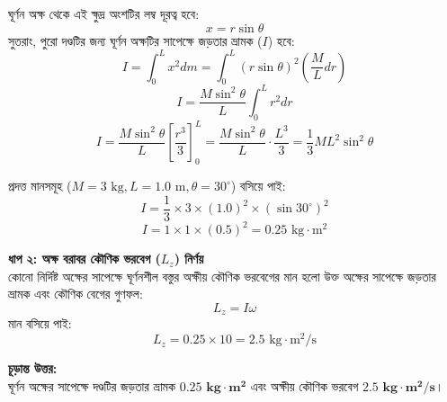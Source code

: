 \documentclass[12pt, a4paper]{article}
\begin{document}
\begin{tcolorbox}[solutionbox={সমাধান (Solution)}]
\begin{center}
\begin{tikzpicture}[>=Stealth, scale=1.4, text=black]
\end{tikzpicture}
\end{center}
\vspace{1em}

ঘূর্ণন অক্ষ থেকে এই ক্ষুদ্র অংশটির লম্ব দূরত্ব হবে: 
$$x = r \sin\theta$$
সুতরাং, পুরো দণ্ডটির জন্য ঘূর্ণন অক্ষটির সাপেক্ষে জড়তার ভ্রামক ($I$) হবে:
$$I = \int_0^L x^2 dm = \int_0^L (r \sin\theta)^2 \left( \frac{M}{L} dr \right)$$ 
$$I = \frac{M \sin^2\theta}{L} \int_0^L r^2 dr$$ 
$$I = \frac{M \sin^2\theta}{L} \left[ \frac{r^3}{3} \right]_0^L = \frac{M \sin^2\theta}{L} \cdot \frac{L^3}{3} = \frac{1}{3} M L^2 \sin^2\theta$$

প্রদত্ত মানসমূহ ($M = 3\text{ kg}, L = 1.0\text{ m}, \theta = 30^\circ$) বসিয়ে পাই:
$$I = \frac{1}{3} \times 3 \times (1.0)^2 \times (\sin 30^\circ)^2$$
$$I = 1 \times 1 \times (0.5)^2 = 0.25\text{ kg}\cdot\text{m}^2$$

\vspace{0.5em}
\noindent
\textbf{ধাপ ২: অক্ষ বরাবর কৌণিক ভরবেগ ($L_z$) নির্ণয়} \\
কোনো নির্দিষ্ট অক্ষের সাপেক্ষে ঘূর্ণনশীল বস্তুর অক্ষীয় কৌণিক ভরবেগের মান হলো উক্ত অক্ষের সাপেক্ষে জড়তার ভ্রামক এবং কৌণিক বেগের গুণফল:
$$L_z = I \omega$$
মান বসিয়ে পাই:
$$L_z = 0.25 \times 10 = 2.5\text{ kg}\cdot\text{m}^2/\text{s}$$

\vspace{1em}
\begin{tcolorbox}[answerbox]
\textbf{চূড়ান্ত উত্তর:} \\
ঘূর্ণন অক্ষের সাপেক্ষে দণ্ডটির জড়তার ভ্রামক $\mathbf{0.25\text{ kg}\cdot\text{m}^2}$ এবং অক্ষীয় কৌণিক ভরবেগ $\mathbf{2.5\text{ kg}\cdot\text{m}^2/\text{s}}$।
\end{tcolorbox}
\end{tcolorbox}
\end{document}
